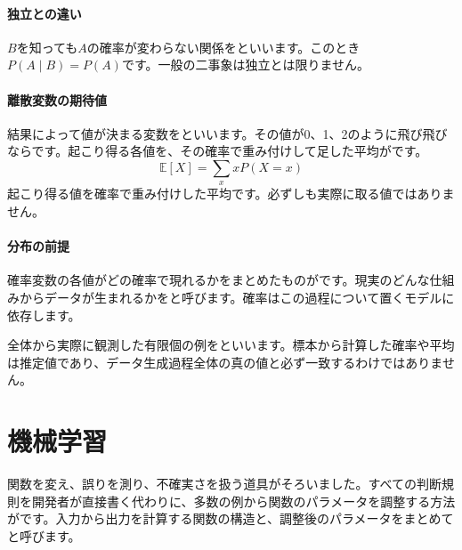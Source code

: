 \paragraph{独立との違い}
        $B$を知っても$A$の確率が変わらない関係をといいます。このとき$P(A\mid B)=P(A)$です。一般の二事象は独立とは限りません。

\par
\endgroup
\medskip
\begingroup
\paragraph{離散変数の期待値}
        結果によって値が決まる変数をといいます。その値が0、1、2のように飛び飛びならです。起こり得る各値を、その確率で重み付けして足した平均がです。
        \[
          \mathbb{E}[X]=\sum_x xP(X=x)
        \]
        起こり得る値を確率で重み付けした平均です。必ずしも実際に取る値ではありません。

\paragraph{分布の前提}
        確率変数の各値がどの確率で現れるかをまとめたものがです。現実のどんな仕組みからデータが生まれるかをと呼びます。確率はこの過程について置くモデルに依存します。

        全体から実際に観測した有限個の例をといいます。標本から計算した確率や平均は推定値であり、データ生成過程全体の真の値と必ず一致するわけではありません。

\par
\endgroup
\par
\endgroup


\section{機械学習}
\label{sec:06-machine-learning-04}

関数を変え、誤りを測り、不確実さを扱う道具がそろいました。すべての判断規則を開発者が直接書く代わりに、多数の例から関数のパラメータを調整する方法がです。入力から出力を計算する関数の構造と、調整後のパラメータをまとめてと呼びます。

\begingroup
  \centering
  \vspace{5mm}
\begingroup
